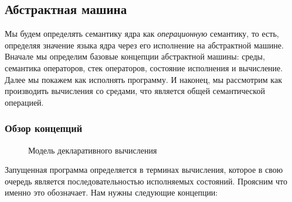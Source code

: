 \subsection{Абстрактная машина}

Мы будем определять семантику ядра как \emph{операционную} семантику, то есть, определяя значение языка ядра через его исполнение на абстрактной машине. Вначале мы определим базовые концепции абстрактной машины: среды, семантика операторов, стек операторов, состояние исполнения и вычисление. Далее мы покажем как исполнять программу. И наконец, мы рассмотрим как производить вычисления со средами, что является общей семантической операцией.







\subsubsection{Обзор концепций}

\begin{figure}
\caption{Модель декларативного вычисления}
\label{figure:the_declarative_computation_model}
\end{figure}

Запущенная программа определяется в терминах вычисления, которое в свою очередь является последовательностью исполняемых состояний. Проясним что именно это обозначает. Нам нужны следующие концепции:


